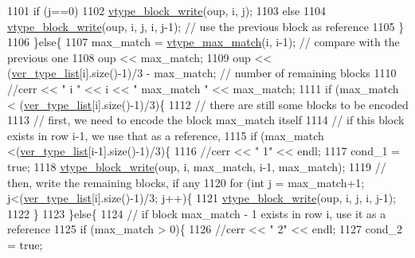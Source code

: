 \begin{DoxyCode}
1101           \textcolor{keywordflow}{if} (j==0)
1102             \hyperlink{classmarked__graph__compressed_a31f9ea72682f9072d0f90faf58a603fe}{vtype\_block\_write}(oup, i, j);
1103           \textcolor{keywordflow}{else}
1104             \hyperlink{classmarked__graph__compressed_a31f9ea72682f9072d0f90faf58a603fe}{vtype\_block\_write}(oup, i, j, i, j-1); \textcolor{comment}{// use the previous block as reference}
1105         \}
1106       \}\textcolor{keywordflow}{else}\{
1107         max\_match = \hyperlink{classmarked__graph__compressed_a5ce51414e335d817f4be781fdcfbe9b1}{vtype\_max\_match}(i, i-1); \textcolor{comment}{// compare with the previous one}
1108         oup << max\_match;
1109         oup << (\hyperlink{classmarked__graph__compressed_af2e3e55223d436628a02758dfae88493}{ver\_type\_list}[i].size()-1)/3 - max\_match; \textcolor{comment}{// number of remaining blocks}
1110         \textcolor{comment}{//cerr << " i " << i << " max\_match " << max\_match;}
1111         \textcolor{keywordflow}{if} (max\_match < (\hyperlink{classmarked__graph__compressed_af2e3e55223d436628a02758dfae88493}{ver\_type\_list}[i].size()-1)/3)\{
1112           \textcolor{comment}{// there are still some blocks to be encoded}
1113           \textcolor{comment}{// first, we need to encode the block max\_match itself}
1114           \textcolor{comment}{// if this block exists in row i-1, we use that as a reference,}
1115           \textcolor{keywordflow}{if} (max\_match <(\hyperlink{classmarked__graph__compressed_af2e3e55223d436628a02758dfae88493}{ver\_type\_list}[i-1].size()-1)/3)\{
1116             \textcolor{comment}{//cerr << " 1" << endl;}
1117             cond\_1 = \textcolor{keyword}{true};
1118             \hyperlink{classmarked__graph__compressed_a31f9ea72682f9072d0f90faf58a603fe}{vtype\_block\_write}(oup, i, max\_match, i-1, max\_match);
1119             \textcolor{comment}{// then, write the remaining blocks, if any}
1120             \textcolor{keywordflow}{for} (\textcolor{keywordtype}{int} j = max\_match+1; j<(\hyperlink{classmarked__graph__compressed_af2e3e55223d436628a02758dfae88493}{ver\_type\_list}[i].size()-1)/3; j++)\{
1121               \hyperlink{classmarked__graph__compressed_a31f9ea72682f9072d0f90faf58a603fe}{vtype\_block\_write}(oup, i, j, i, j-1);
1122             \}
1123           \}\textcolor{keywordflow}{else}\{
1124             \textcolor{comment}{// if block max\_match - 1 exists in row i, use it as a reference}
1125             \textcolor{keywordflow}{if} (max\_match > 0)\{
1126               \textcolor{comment}{//cerr << " 2" << endl;}
1127               cond\_2 = \textcolor{keyword}{true};

\end{DoxyCode}
